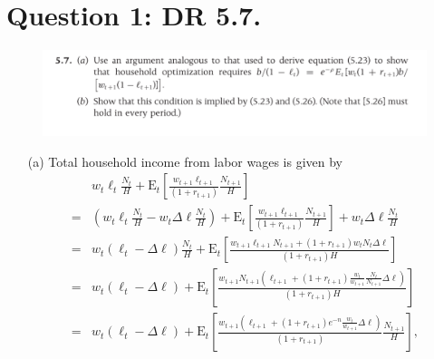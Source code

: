 \documentclass{article}
\newcommand{\Et}[1]{\mathrm{E}_t\left[#1\right]}
\begin{document}
    
    \section{Question 1: DR 5.7.}
        
        \begin{figure}[H]
            \centering
            \includegraphics[width=\textwidth]{./HW5-DR5.7.png}
        \end{figure}
        
        
        \begin{itemize}
            \item[(a)]
            Total household income from labor wages is given by
            \begin{align}
                & w_t \ell_t \frac{N_t}{H}
                + \Et{ \frac{w_{t+1} \ell_{t+1}}{(1+r_{t+1})} \frac{N_{t+1}}{H} }
                \\
                =& \left(
                    w_t \ell_t \frac{N_t}{H} - w_t \Delta \ell \frac{N_t}{H}
                \right)
                + \Et{\frac{w_{t+1} \ell_{t+1}}{(1+r_{t+1})} \frac{N_{t+1}}{H} } + w_t \Delta \ell \frac{N_t}{H}
                \\
                =& w_t (\ell_t - \Delta \ell)\frac{N_t}{H} + \Et{\frac{w_{t+1} \ell_{t+1}N_{t+1} + (1+r_{t+1}) w_t N_{t} \Delta \ell}{(1+r_{t+1})H}}
                \\
                =& w_t (\ell_t - \Delta \ell) + \Et{\frac{w_{t+1} N_{t+1} \left(\ell_{t+1} +  (1+r_{t+1}) \frac{w_t}{w_{t+1}} \frac{N_t}{N_{t+1}} \Delta \ell \right)}{(1+r_{t+1})H}}
                \\
                =& w_t (\ell_t - \Delta \ell) + \Et{\frac{w_{t+1} \left(\ell_{t+1} + (1+r_{t+1})e^{-n} \frac{w_t}{w_{t+1}} \Delta \ell \right)}{(1+r_{t+1})} \frac{N_{t+1}}{H} },
            \end{align}
        

\end{itemize}
\end{document}
